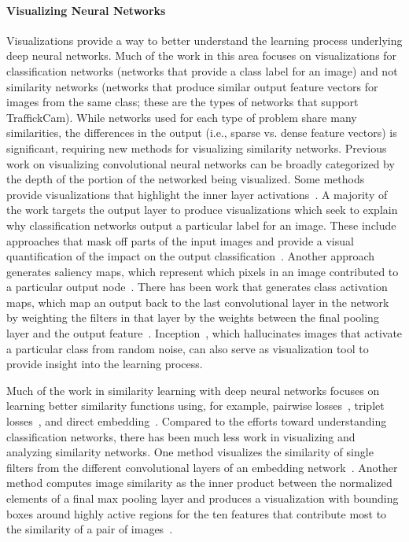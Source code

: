 \documentclass[12pt]{article}
\begin{document}
\paragraph{Visualizing Neural Networks} Visualizations provide a way to better understand the learning process underlying deep neural networks. Much of the work in this area focuses on visualizations for classification networks (networks that provide a class label for an image) and not similarity networks (networks that produce similar output feature vectors for images from the same class; these are the types of networks that support TraffickCam). While networks used for each type of problem share many similarities, the differences in the output (i.e., sparse vs. dense feature vectors) is significant, requiring new methods for visualizing similarity networks. Previous work on visualizing convolutional neural networks can be broadly categorized by the depth of the portion of the networked being visualized. Some methods provide visualizations that highlight the inner layer activations~\cite{netdissect2017,visualization_techreport,scenecnn_iclr15}. A majority of the work targets the output layer to produce visualizations which seek to explain why classification networks output a particular label for an image. These include approaches that mask off parts of the input images and provide a visual quantification of the impact on the output classification~\cite{ZeilerF13}. Another approach generates saliency maps, which represent which pixels in an image contributed to a particular output node~\cite{deepInside}. There has been work that generates class activation maps, which map an output back to the last convolutional layer in the network by weighting the filters in that layer by the weights between the final pooling layer and the output feature~\cite{cam}. Inception~\cite{szegedy2015going}, which hallucinates images that activate a particular class from random noise, can also serve as visualization tool to provide insight into the learning process. 

Much of the work in similarity learning with deep neural networks focuses on learning better similarity functions using, for example, pairwise losses~\cite{sun2014deep,wang2014learning,yi2014deep}, triplet losses~\cite{HermansBeyer2017Arxiv,schroff2015facenet,song2016deep,ustinova2016learning}, and direct embedding~\cite{Proxy}. Compared to the efforts toward understanding classification networks, there has been much less work in visualizing and analyzing similarity networks. One method visualizes the similarity of single filters from the different convolutional layers of an embedding network~\cite{Ahmed_2015_CVPR}. Another method computes image similarity as the inner product between the normalized elements of a final max pooling layer and produces a visualization with bounding boxes around highly active regions for the ten features that contribute most to the similarity of a pair of images~\cite{RTC16,tolias2016rmac}. 
\end{document}

